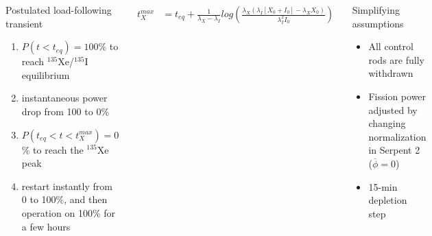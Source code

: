 \begin{frame}
\begin{columns}
	\column[t]{6.3cm}
	\begin{block}{Postulated load-following transient}
		\begin{enumerate}             
			\item $P(t<t_{eq})=100$\% to reach $^{135}$Xe/$^{135}$I equilibrium
			\item instantaneous power drop from 100 to 0\%
			\item $P(t_{eq}<t<t^{max}_{X})=0$\% to reach the 
			$^{135}$Xe peak
			\item restart instantly from 0 to 100\%, and then operation on 
			100\% for a few hours
		\end{enumerate}
			\vspace{-3mm}
	\end{block}
		{\footnotesize
		\begin{align}\label{eq:time-xe-max}
		t^{max}_{X} &= t_{eq} + \frac{1}{\lambda_X-\lambda_I}
		log\left(\frac{\lambda_X(\lambda_I[X_0+I_0]-\lambda_XX_0)}{\lambda_I^2 
		I_0}\right) \nonumber
		\end{align}}
				\vspace{-3mm}
	\begin{block}{Simplifying assumptions}
		\begin{itemize}
			\item All control rods are fully withdrawn
			\item Fission power adjusted by changing normalization in Serpent 
			2 ($\overline{\phi}=0$)
			\item 15-min depletion step
		\end{itemize}
		
	\end{block}
\end{columns}
\end{frame}

